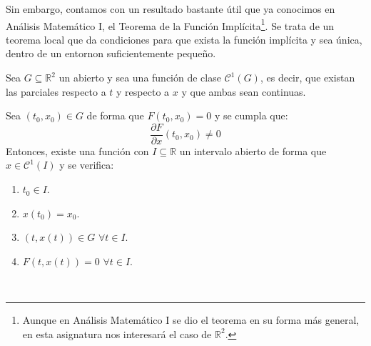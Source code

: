 Sin embargo, contamos con un resultado bastante útil que ya conocimos en Análisis Matemático I, el Teorema de la Función Implícita\footnote{Aunque en Análisis Matemático I se dio el teorema en su forma más general, en esta asignatura nos interesará el caso de $\mathbb{R}^2$.}. Se trata de un teorema local que da condiciones para que exista la función implícita y sea única, dentro de un entornon suficientemente pequeño.

\begin{teo}
    Sea $G\subseteq \mathbb{R}^2$ un abierto y sea
    una función de clase $\mathcal{C}^1(G)$, es decir, que existan las parciales respecto a $t$ y respecto a $x$ y que ambas sean continuas.

    \noindent
    Sea $(t_0,x_0)\in G$ de forma que $F(t_0,x_0)=0$ y se cumpla que:
    \begin{equation*}
        \dfrac{\partial F}{\partial x}(t_0,x_0) \neq 0
    \end{equation*}
    Entonces, existe una función 
    con $I\subseteq \mathbb{R}$ un intervalo abierto de forma que $x\in \mathcal{C}^1(I)$ y se verifica:
    \begin{enumerate}
        \item $t_0 \in I$.
        \item $x(t_0) = x_0$.
        \item $(t,x(t))\in G$ $\forall t\in I$.
        \item $F(t,x(t))=0$ $\forall t\in I$.
    \end{enumerate}
\end{teo}~\\

%
%

